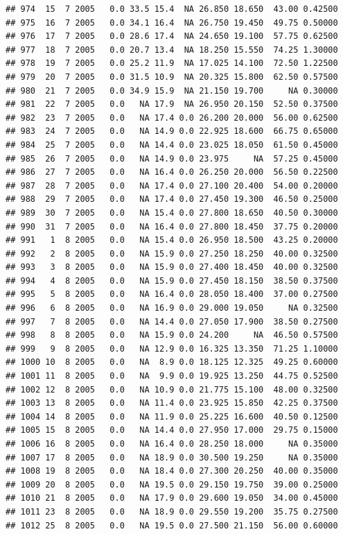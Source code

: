 \documentclass[
]{book}
\begin{document}
\begin{verbatim}
## 974  15  7 2005   0.0 33.5 15.4  NA 26.850 18.650  43.00 0.42500
## 975  16  7 2005   0.0 34.1 16.4  NA 26.750 19.450  49.75 0.50000
## 976  17  7 2005   0.0 28.6 17.4  NA 24.650 19.100  57.75 0.62500
## 977  18  7 2005   0.0 20.7 13.4  NA 18.250 15.550  74.25 1.30000
## 978  19  7 2005   0.0 25.2 11.9  NA 17.025 14.100  72.50 1.22500
## 979  20  7 2005   0.0 31.5 10.9  NA 20.325 15.800  62.50 0.57500
## 980  21  7 2005   0.0 34.9 15.9  NA 21.150 19.700     NA 0.30000
## 981  22  7 2005   0.0   NA 17.9  NA 26.950 20.150  52.50 0.37500
## 982  23  7 2005   0.0   NA 17.4 0.0 26.200 20.000  56.00 0.62500
## 983  24  7 2005   0.0   NA 14.9 0.0 22.925 18.600  66.75 0.65000
## 984  25  7 2005   0.0   NA 14.4 0.0 23.025 18.050  61.50 0.45000
## 985  26  7 2005   0.0   NA 14.9 0.0 23.975     NA  57.25 0.45000
## 986  27  7 2005   0.0   NA 16.4 0.0 26.250 20.000  56.50 0.22500
## 987  28  7 2005   0.0   NA 17.4 0.0 27.100 20.400  54.00 0.20000
## 988  29  7 2005   0.0   NA 17.4 0.0 27.450 19.300  46.50 0.25000
## 989  30  7 2005   0.0   NA 15.4 0.0 27.800 18.650  40.50 0.30000
## 990  31  7 2005   0.0   NA 16.4 0.0 27.800 18.450  37.75 0.20000
## 991   1  8 2005   0.0   NA 15.4 0.0 26.950 18.500  43.25 0.20000
## 992   2  8 2005   0.0   NA 15.9 0.0 27.250 18.250  40.00 0.32500
## 993   3  8 2005   0.0   NA 15.9 0.0 27.400 18.450  40.00 0.32500
## 994   4  8 2005   0.0   NA 15.9 0.0 27.450 18.150  38.50 0.37500
## 995   5  8 2005   0.0   NA 16.4 0.0 28.050 18.400  37.00 0.27500
## 996   6  8 2005   0.0   NA 16.9 0.0 29.000 19.050     NA 0.32500
## 997   7  8 2005   0.0   NA 14.4 0.0 27.050 17.900  38.50 0.27500
## 998   8  8 2005   0.0   NA 15.9 0.0 24.200     NA  46.50 0.57500
## 999   9  8 2005   0.0   NA 12.9 0.0 16.325 13.350  71.25 1.10000
## 1000 10  8 2005   0.0   NA  8.9 0.0 18.125 12.325  49.25 0.60000
## 1001 11  8 2005   0.0   NA  9.9 0.0 19.925 13.250  44.75 0.52500
## 1002 12  8 2005   0.0   NA 10.9 0.0 21.775 15.100  48.00 0.32500
## 1003 13  8 2005   0.0   NA 11.4 0.0 23.925 15.850  42.25 0.37500
## 1004 14  8 2005   0.0   NA 11.9 0.0 25.225 16.600  40.50 0.12500
## 1005 15  8 2005   0.0   NA 14.4 0.0 27.950 17.000  29.75 0.15000
## 1006 16  8 2005   0.0   NA 16.4 0.0 28.250 18.000     NA 0.35000
## 1007 17  8 2005   0.0   NA 18.9 0.0 30.500 19.250     NA 0.35000
## 1008 19  8 2005   0.0   NA 18.4 0.0 27.300 20.250  40.00 0.35000
## 1009 20  8 2005   0.0   NA 19.5 0.0 29.150 19.750  39.00 0.25000
## 1010 21  8 2005   0.0   NA 17.9 0.0 29.600 19.050  34.00 0.45000
## 1011 23  8 2005   0.0   NA 18.9 0.0 29.550 19.200  35.75 0.27500
## 1012 25  8 2005   0.0   NA 19.5 0.0 27.500 21.150  56.00 0.60000

\end{verbatim}
\end{document}
